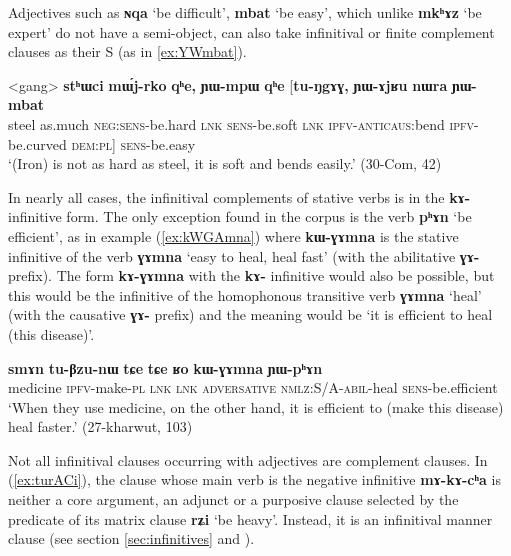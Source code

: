 \documentclass[oneside,a4paper,11pt]{article}
\newcommand{\ipa}[1]{\textbf{\phon#1}} %
\newcommand{\jpg}[2]{\ipa{#1} `#2'} %
\begin{document}
Adjectives such as \jpg{ɴqa}{be difficult}, \jpg{mbat}{be easy}, which unlike \jpg{mkʰɤz}{be expert} do not have a semi-object, can also take infinitival or finite complement clauses as their S (as in \ref{ex:YWmbat}).

\begin{exe}
\ex \label{ex:YWmbat}
\gll
<gang> 	\ipa{stʰɯci} 	\ipa{mɯ́j-rko} 	\ipa{qʰe,} 	\ipa{ɲɯ-mpɯ} 	\ipa{qʰe} 	[\ipa{tu-ŋgɤɣ,} 	\ipa{ɲɯ-ɤjʁu} 	\ipa{nɯra} 	\ipa{ɲɯ-mbat} \\
steel as.much \textsc{neg:sens}-be.hard \textsc{lnk} \textsc{sens}-be.soft \textsc{lnk} \textsc{ipfv-anticaus}:bend \textsc{ipfv}-be.curved  \textsc{dem:pl}] \textsc{sens}-be.easy \\
\glt `(Iron) is not as hard as steel, it is soft and bends easily.' (30-Com, 42)
\end{exe}

In nearly all cases, the infinitival complements of stative verbs is in the \ipa{kɤ-} infinitive form. The only exception found in the corpus is the verb  \jpg{pʰɤn}{be efficient}, as in example (\ref{ex:kWGAmna}) where \ipa{kɯ-ɣɤmna} is the stative infinitive of the verb \ipa{ɣɤmna} `easy to heal, heal fast' (with the abilitative \ipa{ɣɤ-} prefix). The form \ipa{kɤ-ɣɤmna} with the \ipa{kɤ-} infinitive would also be possible, but this would be the infinitive of the homophonous transitive verb \ipa{ɣɤmna} `heal' (with the causative \ipa{ɣɤ-} prefix) and the meaning would be `it is efficient to heal (this disease)'.
 
 
 \begin{exe}
\ex \label{ex:kWGAmna}
\gll \ipa{smɤn} 	\ipa{tu-βzu-nɯ} 	\ipa{tɕe} 	\ipa{tɕe} 	\ipa{ʁo} 	\ipa{kɯ-ɣɤmna} 	\ipa{ɲɯ-pʰɤn} \\
medicine \textsc{ipfv}-make-\textsc{pl} \textsc{lnk} \textsc{lnk} \textsc{adversative}  \textsc{nmlz:S/A}-\textsc{abil}-heal \textsc{sens}-be.efficient \\
\glt `When they use medicine, on the other hand, it is efficient to (make this disease) heal faster.' (27-kharwut, 103)
\end{exe}

Not all infinitival clauses occurring with adjectives are complement clauses. In (\ref{ex:turACi}), the clause whose main verb is the negative infinitive \ipa{mɤ-kɤ-cʰa} is neither a core argument, an adjunct or a purposive clause selected by the predicate of its matrix clause \jpg{rʑi}{be heavy}. Instead, it is an infinitival manner clause (see section \ref{sec:infinitives} and \citealt{jacques14linking}).
\end{document}
